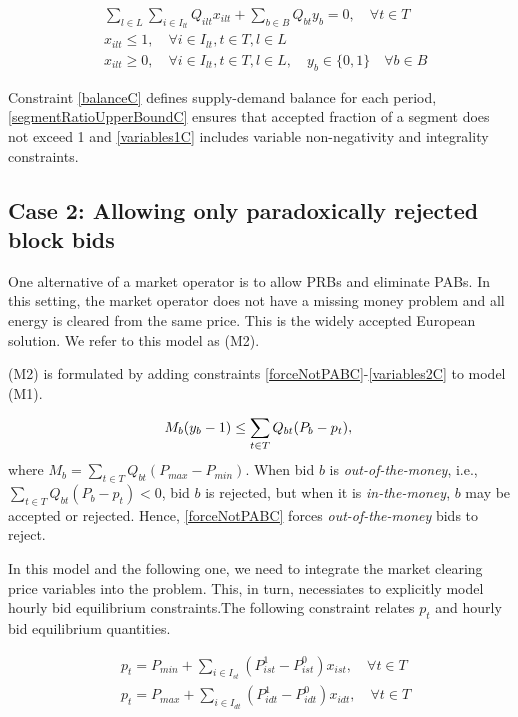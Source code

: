 \documentclass[conference]{IEEEtran}
\begin{document}
\begin{align}
     &\sum_{l\in L} \sum_{i \in I_{lt}} Q_{ilt}x_{ilt} + \sum_{b\in B} Q_{bt} y_b = 0, \quad \forall t\in T \label{balanceC}\\
     & x_{ilt} \leq 1, \quad \forall i \in I_{lt},  t\in T , l\in L \label{segmentRatioUpperBoundC} \\
     & x_{ilt} \geq 0, \quad\forall i \in I_{lt},  t\in T , l\in L , \quad  y_b \in \{0,1\} \quad \forall b \in B \label{variables1C}
\end{align}

Constraint \eqref{balanceC} defines supply-demand balance for each period, \eqref{segmentRatioUpperBoundC} ensures that accepted fraction of a segment does not exceed 1 and \eqref{variables1C} includes variable non-negativity and integrality constraints.

\subsection{Case 2: Allowing only paradoxically rejected block bids}
One alternative of a market operator is to allow PRBs and eliminate PABs. In this setting, the market operator does not have a missing money problem and all energy is cleared from the same price. This is the widely accepted European solution. We refer to this model as (M2).

(M2) is formulated by adding constraints \eqref{forceNotPABC}-\eqref{variables2C} to model (M1).

\begin{equation}
 \label{forceNotPABC}
     M_b (y_b-1)\leq \sum_{t\in T} Q_{bt} (P_b-p_t), \\   
\end{equation}
where $M_b= \sum_{t\in T} Q_{bt} (P_{max}-P_{min})$. When bid $b$ is \textit{out-of-the-money}, i.e., $\sum_{t\in T}Q_{bt} (P_b-p_t) < 0$, bid $b$ is rejected, but when it is \textit{in-the-money}, $b$ may be accepted or rejected. Hence, \eqref{forceNotPABC} forces \textit{out-of-the-money} bids to reject.

In this model and the following one, we need to integrate the market clearing price variables into the problem. This, in turn, necessiates to explicitly model hourly bid equilibrium constraints.The following constraint relates $p_t$ and hourly bid equilibrium quantities.

\begin{equation}
    \label{mcpC}
    \begin{split}
         & p_t = P_{min} + \sum_{i\in I_{st}} (P_{ist}^1-P_{ist}^0){x_{ist}}, \quad \forall t\in T \\
         & p_t = P_{max} + \sum_{i \in I_{dt}} (P_{idt}^1-P_{idt}^0){x_{idt}}, \quad \forall t\in T \\
     \end{split}
\end{equation}
\end{document}
